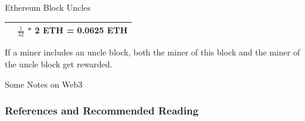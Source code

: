 \documentclass[]{beamer}
\begin{document}
\begin{frame}{Ethereum Block Uncles}
{{\begin{tabularx}{300pt}{X X}
			\rowcolor{lightergray}{\footnotesize Uncle Block Inclusion} &{\footnotesize $\frac{1} {32}$ \hspace{1pt} $*$ 2 ETH = 0.0625 ETH}  
			\bigstrut \\
			\bottomrule
		\end{tabularx}
	}
\center 
\begin{tiny}
If a miner includes an uncle block, both the miner of this block and the miner of
the uncle block get rewarded.
\end{tiny}
\vspace{0.5em} }
\end{frame}

\begin{frame}{Some Notes on Web3}
	\begin{figure}
		
	\end{figure}
\end{frame}


\begin{frame}%
\frametitle{References and Recommended Reading}
	
	
\end{frame}
\end{document}
